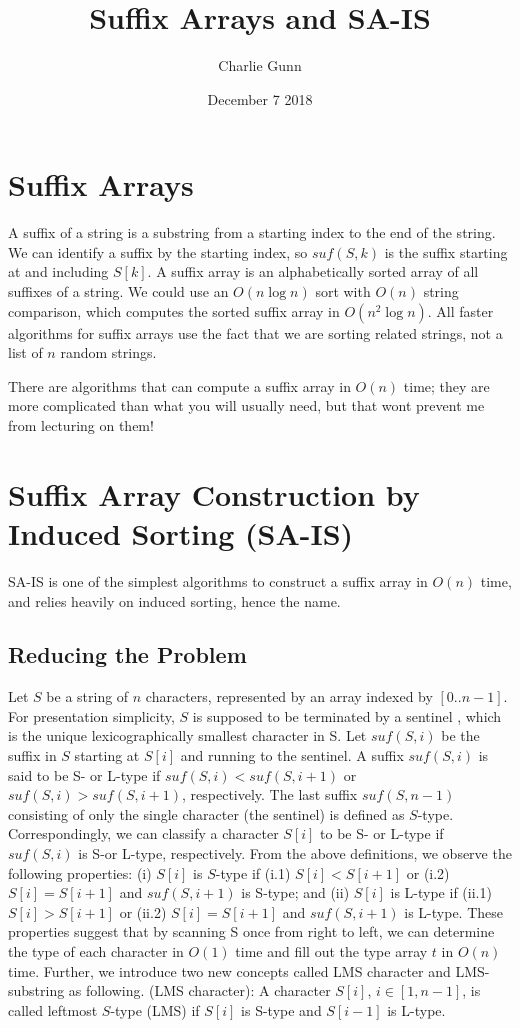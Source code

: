 \documentclass{article}
\title{Suffix Arrays and SA-IS}
\author{Charlie Gunn}
\date{December 7 2018}
\begin{document}
\maketitle

\section{Suffix Arrays}

A suffix of a string is a substring from a starting index to the end of the string.  We can identify a suffix by the starting index, so $suf(S, k)$ is the suffix starting at and including $S[k]$. A suffix array is an alphabetically sorted array of all suffixes of a string.  We could use an $O(n \log n)$ sort with $O(n)$ string comparison, which computes the sorted suffix array in $O(n^2 \log n)$.  All faster algorithms for suffix arrays use the fact that we are sorting related strings, not a list of $n$ random strings.

There are algorithms that can compute a suffix array in $O(n)$ time; they are more complicated than what you will usually need, but that wont prevent me from lecturing on them!

\section{Suffix Array Construction by Induced Sorting (SA-IS)}
SA-IS is one of the simplest algorithms to construct a suffix array in $O(n)$ time, and relies heavily on induced sorting, hence the name.

\subsection{Reducing the Problem}
Let $S$ be a string of $n$ characters, represented by an array indexed by $[0..n - 1]$. For presentation simplicity, $S$ is supposed to be terminated by a
sentinel \textdollar, which is the unique lexicographically smallest character in S. Let $suf(S, i)$ be the suffix in $S$ starting at $S[i]$ and running to the sentinel. A suffix $suf(S, i)$ is said to be S- or L-type if $suf(S, i) < suf(S, i + 1)$ or $suf(S, i) > suf(S, i + 1)$, respectively. The last suffix $suf(S, n - 1)$ consisting of only the single character \textdollar (the sentinel) is defined as $S$-type. Correspondingly, we can classify a character $S[i]$ to be S- or L-type if $suf(S, i)$ is S-or L-type, respectively. From the above definitions, we observe the following properties: (i) $S[i]$ is $S$-type if (i.1) $S[i] < S[i + 1]$ or (i.2) $S[i] = S[i + 1]$ and $suf(S, i + 1)$ is S-type; and (ii) $S[i]$ is L-type if (ii.1) $S[i] > S[i + 1]$ or (ii.2) $S[i] = S[i + 1]$ and $suf(S, i + 1)$ is L-type. These properties suggest that by scanning S once from right to left, we can determine the type of each character in $O(1)$ time and fill out the type array $t$ in $O(n)$ time. Further, we introduce two new concepts called LMS character and LMS-substring as following.
 (LMS character): A character $S[i]$, $i \in [1, n - 1]$, is called leftmost $S$-type (LMS) if $S[i]$ is S-type and $S[i - 1]$ is L-type.
\end{document}
